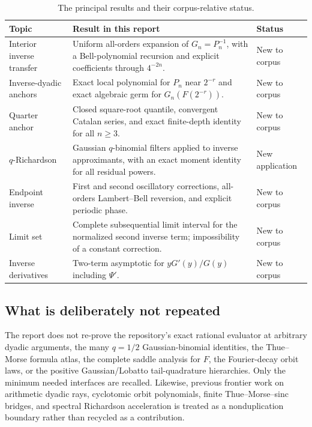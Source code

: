 \documentclass[11pt,oneside]{article}
\numberwithin{equation}{section}
\theoremstyle{definition}
\theoremstyle{remark}
\begin{document}
\begin{table}[ht]
\centering
\small
\begin{tabularx}{\textwidth}{@{}p{}X p{}@{}}
\toprule
Topic & Result in this report & Status \\
\midrule
Interior inverse transfer & Uniform all-orders expansion of $G_n=P_n^{-1}$, with a Bell-polynomial recursion and explicit coefficients through $4^{-2n}$. & New to corpus \\
Inverse-dyadic anchors & Exact local polynomial for $P_n$ near $2^{-r}$ and exact algebraic germ for $G_n(F(2^{-r}))$. & New to corpus \\
Quarter anchor & Closed square-root quantile, convergent Catalan series, and exact finite-depth identity for all $n\ge3$. & New to corpus \\
$q$-Richardson & Gaussian $q$-binomial filters applied to inverse approximants, with an exact moment identity for all residual powers. & New application \\
Endpoint inverse & First and second oscillatory corrections, all-orders Lambert--Bell reversion, and explicit periodic phase. & New to corpus \\
Limit set & Complete subsequential limit interval for the normalized second inverse term; impossibility of a constant correction. & New to corpus \\
Inverse derivatives & Two-term asymptotic for $yG'(y)/G(y)$ including $\Psi'$. & New to corpus \\
\bottomrule
\end{tabularx}
\caption{The principal results and their corpus-relative status.}
\label{p1:tab:contribution-map}
\end{table}

\subsection{What is deliberately not repeated}

The report does not re-prove the repository's exact rational evaluator at arbitrary dyadic
arguments, the many $q=1/2$ Gaussian-binomial identities, the Thue--Morse formula atlas,
the complete saddle analysis for $F$, the Fourier-decay orbit laws, or the positive
Gaussian/Lobatto tail-quadrature hierarchies.  Only the minimum needed interfaces are recalled.
Likewise, previous frontier work on arithmetic dyadic rays, cyclotomic orbit polynomials,
finite Thue--Morse--sinc bridges, and spectral Richardson acceleration is treated as a
nonduplication boundary rather than recycled as a contribution.
\end{document}
